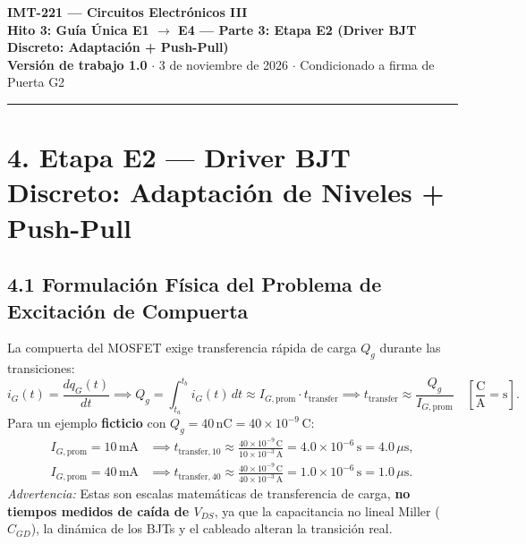 \documentclass[10pt, a4paper, landscape]{article}
\begin{document}
\noindent
{\LARGE \textbf{\textcolor{ucbblue}{IMT-221 — Circuitos Electrónicos III}}}\\[0.15cm]
{\Large \textbf{Hito 3: Guía Única E1 $\rightarrow$ E4 — Parte 3: Etapa E2 (Driver BJT Discreto: Adaptación + Push-Pull)}}\\[0.1cm]
{\small \textbf{Versión de trabajo 1.0} $\cdot$ 3 de noviembre de 2026 $\cdot$ Condicionado a firma de Puerta G2}
\par\vspace{0.2cm}\noindent\rule{\linewidth}{0.4pt}\vspace{0.3cm}

\section*{4. Etapa E2 — Driver BJT Discreto: Adaptación de Niveles + Push-Pull}

\subsection*{4.1 Formulación Física del Problema de Excitación de Compuerta}

La compuerta del MOSFET exige transferencia rápida de carga $Q_g$ durante las transiciones:
\begin{equation}
    i_G(t) = \frac{dq_G(t)}{dt} \implies Q_g = \int_{t_a}^{t_b} i_G(t)\,dt \approx I_{G,\text{prom}} \cdot t_{\text{transfer}} \implies t_{\text{transfer}} \approx \frac{Q_g}{I_{G,\text{prom}}} \quad \left[\frac{\text{C}}{\text{A}} = \text{s}\right].
\end{equation}
Para un ejemplo \textbf{ficticio} con $Q_g = 40\,\text{nC} = 40 \times 10^{-9}\,\text{C}$:
\begin{align}
    I_{G,\text{prom}} = 10\,\text{mA} &\implies t_{\text{transfer},10} \approx \frac{40 \times 10^{-9}\,\text{C}}{10 \times 10^{-3}\,\text{A}} = 4.0 \times 10^{-6}\,\text{s} = 4.0\,\mu\text{s}, \\
    I_{G,\text{prom}} = 40\,\text{mA} &\implies t_{\text{transfer},40} \approx \frac{40 \times 10^{-9}\,\text{C}}{40 \times 10^{-3}\,\text{A}} = 1.0 \times 10^{-6}\,\text{s} = 1.0\,\mu\text{s}.
\end{align}
\textit{Advertencia:} Estas son escalas matemáticas de transferencia de carga, \textbf{no tiempos medidos de caída de $V_{DS}$}, ya que la capacitancia no lineal Miller ($C_{GD}$), la dinámica de los BJTs y el cableado alteran la transición real.
\end{document}
